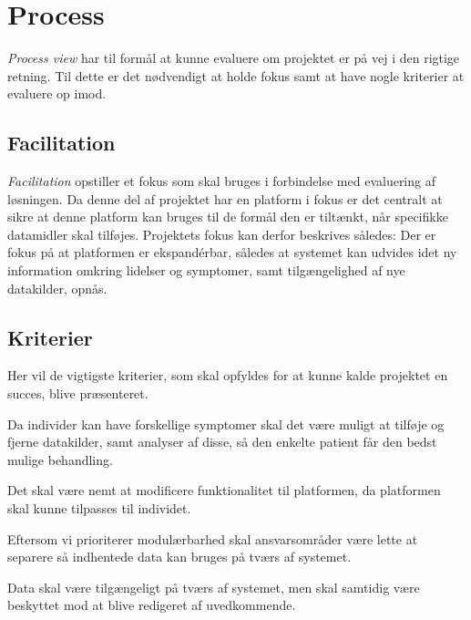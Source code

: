 \section{Process}\label{sec:process}
\emph{Process view} har til formål at kunne evaluere om projektet er på vej i den rigtige retning. 
Til dette er det nødvendigt at holde fokus samt at have nogle kriterier at evaluere op imod.

\subsection{Facilitation}
\emph{Facilitation} opstiller et fokus som skal bruges i forbindelse med evaluering af løsningen.
Da denne del af projektet har en platform i fokus er det centralt at sikre at denne platform kan bruges til de formål den er tiltænkt, når specifikke datamidler skal tilføjes.
Projektets fokus kan derfor beskrives således:
Der er fokus på at platformen er ekspandérbar, således at systemet kan udvides idet ny information omkring lidelser og symptomer, samt tilgængelighed af nye datakilder, opnås.

\subsection{Kriterier}\label{firstsubseckriterier}
Her vil de vigtigste kriterier, som skal opfyldes for at kunne kalde projektet en succes, blive præsenteret.

\begin{description}[style=nextline]
	\item[Modulær] 
	Da individer kan have forskellige symptomer skal det være muligt at tilføje og fjerne datakilder, samt analyser af disse, så den enkelte patient får den bedst mulige behandling.
	\item[Fleksibel]
	Det skal være nemt at modificere funktionalitet til platformen, da platformen skal kunne tilpasses til individet.
	\item[Kombinerbar] Eftersom vi prioriterer modulærbarhed skal ansvarsområder være lette at separere så indhentede data kan bruges på tværs af systemet.
	\item[Kommunikativ] Data skal være tilgængeligt på tværs af systemet, men skal samtidig være beskyttet mod at blive redigeret af uvedkommende.
\end{description}